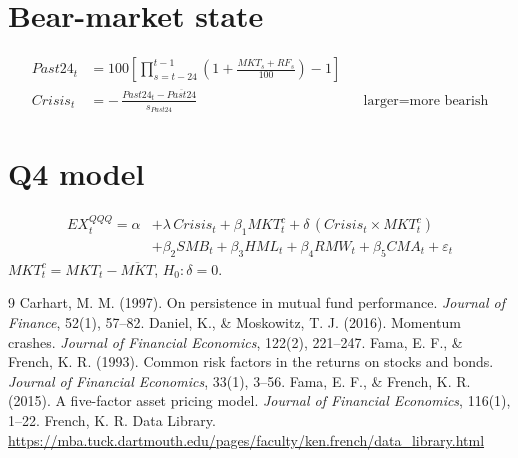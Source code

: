 \documentclass[11pt]{article}
\newcommand{\EX}{\mathit{EX}}
\newcommand{\MKT}{\mathit{MKT}}
\newcommand{\SMB}{\mathit{SMB}}
\newcommand{\HML}{\mathit{HML}}
\newcommand{\RMW}{\mathit{RMW}}
\newcommand{\CMA}{\mathit{CMA}}
\newcommand{\RF}{\mathit{RF}}
\newcommand{\PT}{\mathit{Past24}}
\begin{document}
\section*{Bear-market state}
\begin{align}
\PT_t &= 100\left[\prod_{s=t-24}^{t-1}\left(1+\frac{\MKT_s+\RF_s}{100}\right)-1\right] \\
\mathit{Crisis}_t &= -\,\frac{\PT_t-\overline{\PT}}{s_{\PT}} && \text{larger}=\text{more bearish}
\end{align}

\section*{Q4 model}
\begin{equation}
\begin{split}
\EX^{QQQ}_t=\alpha&+\lambda\,\mathit{Crisis}_t+\beta_1\MKT^c_t+\delta\,(\mathit{Crisis}_t\times\MKT^c_t)\\
&+\beta_2\SMB_t+\beta_3\HML_t+\beta_4\RMW_t+\beta_5\CMA_t+\varepsilon_t
\end{split}
\end{equation}
$\MKT^c_t=\MKT_t-\overline{\MKT}$, \quad $H_0:\delta=0$.

\begin{thebibliography}{9}\small
{} Carhart, M. M. (1997). On persistence in mutual fund performance. \emph{Journal of Finance}, 52(1), 57--82.
 Daniel, K., \& Moskowitz, T. J. (2016). Momentum crashes. \emph{Journal of Financial Economics}, 122(2), 221--247.
 Fama, E. F., \& French, K. R. (1993). Common risk factors in the returns on stocks and bonds. \emph{Journal of Financial Economics}, 33(1), 3--56.
 Fama, E. F., \& French, K. R. (2015). A five-factor asset pricing model. \emph{Journal of Financial Economics}, 116(1), 1--22.
 French, K. R. Data Library. \url{https://mba.tuck.dartmouth.edu/pages/faculty/ken.french/data_library.html}
\end{thebibliography}
\end{document}
